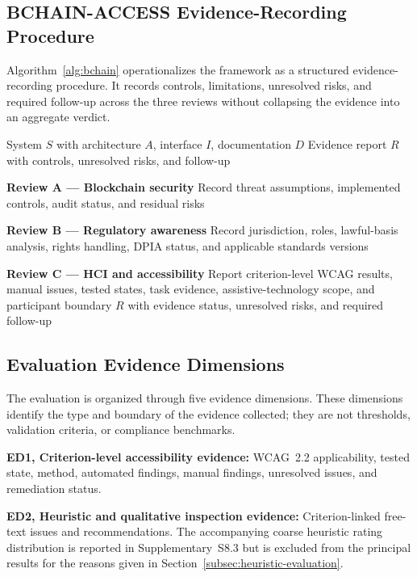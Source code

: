 \documentclass[journal]{IEEEtran}
\begin{document}
\subsection{BCHAIN-ACCESS Evidence-Recording Procedure}

Algorithm~\ref{alg:bchain} operationalizes the framework as a structured evidence-recording procedure. It records controls, limitations, unresolved risks, and required follow-up across the three reviews without collapsing the evidence into an aggregate verdict.

\begin{algorithm}
\caption{BCHAIN-ACCESS three-part evidence-recording procedure}
\label{alg:bchain}
\begin{algorithmic}[1]
\Require System $S$ with architecture $A$, interface $I$, documentation $D$
\Ensure Evidence report $R$ with controls, unresolved risks, and follow-up

\State \textbf{Review A --- Blockchain security}
\State Record threat assumptions, implemented controls, audit status, and residual risks

\State \textbf{Review B --- Regulatory awareness}
\State Record jurisdiction, roles, lawful-basis analysis, rights handling, DPIA status, and applicable standards versions

\State \textbf{Review C --- HCI and accessibility}
\State Report criterion-level WCAG results, manual issues, tested states, task evidence, assistive-technology scope, and participant boundary
\State \Return $R$ with evidence status, unresolved risks, and required follow-up
\end{algorithmic}
\end{algorithm}

\subsection{Evaluation Evidence Dimensions}
\label{sec:evidence-dimensions}

The evaluation is organized through five evidence dimensions. These dimensions identify the type and boundary of the evidence collected; they are not thresholds, validation criteria, or compliance benchmarks.

\noindent\textbf{ED1, Criterion-level accessibility evidence:} WCAG~2.2 applicability, tested state, method, automated findings, manual findings, unresolved issues, and remediation status.

\noindent\textbf{ED2, Heuristic and qualitative inspection evidence:} Criterion-linked free-text issues and recommendations. The accompanying coarse heuristic rating distribution is reported in Supplementary~S8.3 but is excluded from the principal results for the reasons given in Section~\ref{subsec:heuristic-evaluation}.
\end{document}
